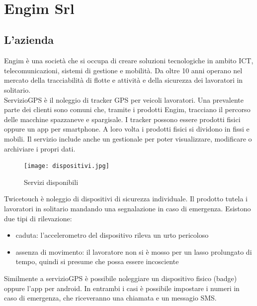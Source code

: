 \documentclass[12pt]{article}
\begin{document}
\thispagestyle{empty}
\newpage 
\thispagestyle{empty}
\
\newpage

\section{Engim Srl}
\subsection{L'azienda}
Engim è una società che si occupa di creare soluzioni tecnologiche in ambito 
ICT, telecomunicazioni, sistemi di gestione e mobilità. Da oltre 10 anni operano 
nel mercato della tracciabilità di flotte e attività e della 
sicurezza dei lavoratori in solitario.
\\ ServizioGPS è il noleggio di tracker GPS per veicoli lavoratori. 
Una prevalente parte dei clienti sono comuni che, tramite i prodotti Engim, 
tracciano il percorso delle macchine spazzaneve e spargisale.
I tracker possono essere prodotti fisici oppure un app per smartphone. A loro 
volta i prodotti fisici si dividono in fissi e mobili. Il servizio include
anche un gestionale per poter visualizzare, modificare o archiviare i propri dati.
\begin{figure}[H]
\texttt{[image: dispositivi.jpg]}
\centering
\caption{Servizi disponibili}
\end{figure}
Twicetouch è noleggio di dispositivi di sicurezza individuale.
Il prodotto tutela i lavoratori in solitario mandando una segnalazione in caso di
emergenza. Esistono due tipi di rilevazione: 
\begin{itemize}
  \item caduta: l'accelerometro del dispositivo rileva un urto pericoloso
  \item assenza di movimento: il lavoratore non si è mosso per un lasso prolungato di tempo, 
  quindi si presume che possa essere incosciente
\end{itemize}
Similmente a servizioGPS è possibile noleggiare un dispositivo fisico (badge) oppure
l'app per android. In entrambi i casi è possibile impostare i numeri in caso di 
emergenza, che riceveranno una chiamata e un messagio SMS.
\end{document}
